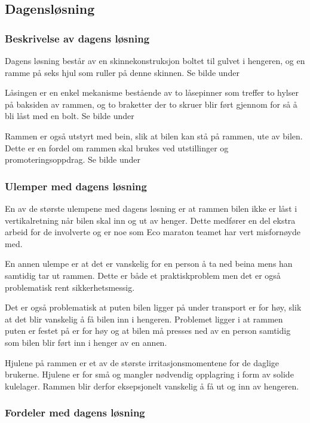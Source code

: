\subsection{Dagensløsning}
\subsubsection{Beskrivelse av dagens løsning}

Dagens løsning består av en skinnekonstruksjon boltet til gulvet i hengeren, og en ramme på seks hjul som ruller på denne skinnen. Se bilde under

Låsingen er en enkel mekanisme bestående av to låsepinner som treffer to hylser på baksiden av rammen, og to braketter der to skruer blir ført gjennom for så å bli låst med en bolt. Se bilde under

Rammen er også utstyrt med bein, slik at bilen kan stå på rammen, ute av bilen. Dette er en fordel om rammen skal brukes ved utstillinger og promoteringsoppdrag.  Se bilde under
\subsubsection{Ulemper med dagens løsning}

En av de største ulempene med dagens løsning er at rammen bilen ikke er låst i vertikalretning når bilen skal inn og ut av henger. Dette medfører en del ekstra arbeid for de involverte og er noe som Eco maraton teamet har vert misfornøyde med.

En annen ulempe er at det er vanskelig for en person å ta ned beina mens han samtidig tar ut rammen. Dette er både et praktiskproblem men det er også problematisk rent sikkerhetsmessig. 

Det er også problematisk at puten bilen ligger på under transport er for høy, slik at det blir vanskelig å få bilen inn i hengeren. Problemet ligger i at rammen puten er festet på er for høy og at bilen må presses ned av en person samtidig som bilen blir ført inn i henger av en annen.

Hjulene på rammen er et av de største irritasjonsmomentene for de daglige brukerne. Hjulene er for små og mangler nødvendig opplagring i form av solide kulelager. Rammen blir derfor eksepsjonelt vanskelig å få ut og inn av hengeren. 

\subsubsection{Fordeler med dagens løsning}

